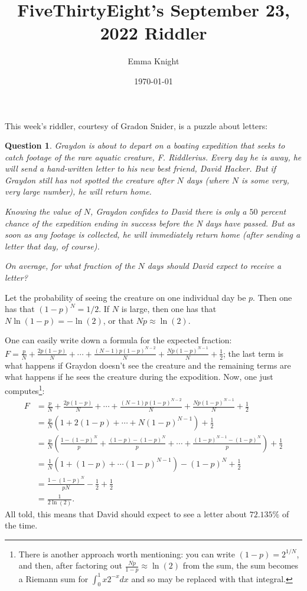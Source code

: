 \documentclass[11pt]{article}
\title{FiveThirtyEight's September 23, 2022 Riddler}
\author{Emma Knight}
\date{\today}
\newtheorem{question}[theorem]{Question}
\theoremstyle{definition}
\begin{document}
\maketitle
This week's riddler, courtesy of Gradon Snider, is a puzzle about letters:
\begin{question}
Graydon is about to depart on a boating expedition that seeks to catch footage of the rare aquatic creature, F. Riddlerius. Every day he is away, he will send a hand-written letter to his new best friend, David Hacker.  But if Graydon still has not spotted the creature after $N$ days (where $N$ is some very, very large number), he will return home.

Knowing the value of $N$, Graydon confides to David there is only a $50$ percent chance of the expedition ending in success before the N days have passed. But as soon as any footage is collected, he will immediately return home (after sending a letter that day, of course).

On average, for what fraction of the $N$ days should David expect to receive a letter?
\end{question}
Let the probability of seeing the creature on one individual day be $p$.  Then one has that $(1-p)^N = 1/2$.  If $N$ is large, then one has that $N\ln(1-p) = -\ln(2)$, or that $Np \approx \ln(2)$.

One can easily write down a formula for the expected fraction: $F = \frac{p}{N} + \frac{2p(1-p)}{N} + \cdots + \frac{(N-1)p(1-p)^{N-2}}{N} + \frac{Np(1-p)^{N-1}}{N} + \frac{1}{2}$; the last term is what happens if Graydon doesn't see the creature and the remaining terms are what happens if he sees the creature during the expodition.  Now, one just computes\footnote{There is another approach worth mentioning: you can write $(1-p) = 2^{1/N}$, and then, after factoring out $\frac{Np}{1-p} \approx \ln(2)$ from the sum, the sum becomes a Riemann sum for $\int_0^1 x2^{-x}dx$ and so may be replaced with that integral.}:
\begin{align*}
F & = \frac{p}{N} + \frac{2p(1-p)}{N} + \cdots + \frac{(N-1)p(1-p)^{N-2}}{N} + \frac{Np(1-p)^{N-1}}{N} + \frac{1}{2} \\
& = \frac{p}{N}\left(1 + 2(1-p) + \cdots + N(1-p)^{N-1}\right) + \frac{1}{2} \\
& = \frac{p}{N}\left(\frac{1-(1-p)^N}{p} + \frac{(1-p)-(1-p)^N}{p} + \cdots + \frac{(1-p)^{N-1} - (1-p)^N}{p}\right) + \frac{1}{2} \\
& = \frac{1}{N}\left(1 + (1-p) + \cdots (1-p)^{N-1}\right) - (1-p)^N + \frac{1}{2} \\
& = \frac{1-(1-p)^N}{pN} -\frac{1}{2} + \frac{1}{2} \\
& = \frac{1}{2\ln(2)}.
\end{align*}
All told, this means that David should expect to see a letter about $72.135\%$ of the time.
\end{document}
